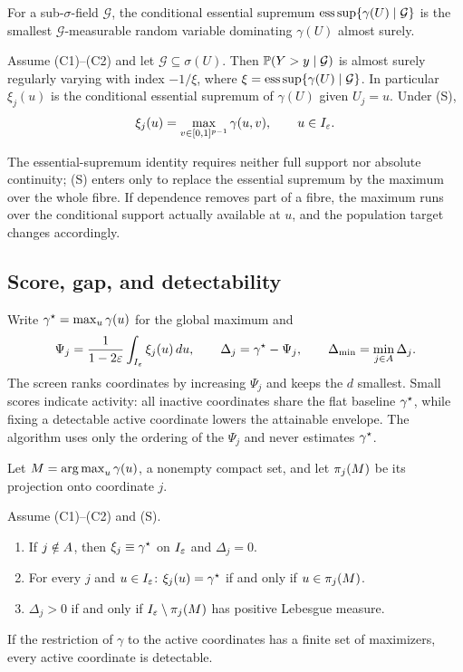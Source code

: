 For a sub-$\sigma$-field $\mathcal G$, the conditional essential
supremum $\operatorname*{ess\,sup}\{\gamma(U)\mid\mathcal G\}$ is the smallest
$\mathcal G$-measurable random variable dominating $\gamma(U)$ almost
surely.

\begin{proposition}[Projection]\label{prop:projection}
Assume (C1)--(C2) and let $\mathcal G\subseteq\sigma(U)$. Then
$\mathbb P(Y>y\mid\mathcal G)$ is almost surely regularly varying with index
$-1/\xi$, where $\xi=\operatorname*{ess\,sup}\{\gamma(U)\mid\mathcal G\}$. In particular
$\xi_j(u)$ is the conditional essential supremum of $\gamma(U)$ given
$U_j=u$. Under (S),
\begin{equation}\label{eq:fibre}
 \xi_j(u)=\max_{v\in[0,1]^{p-1}}\gamma(u,v),\qquad u\in I_\varepsilon.
\end{equation}
\end{proposition}

The essential-supremum identity requires neither full support nor absolute
continuity; (S) enters only to replace the essential supremum by the
maximum over the whole fibre. If dependence removes part of a fibre, the
maximum runs over the conditional support actually available at $u$, and
the population target changes accordingly.

\subsection{Score, gap, and detectability}

Write $\gamma^\star=\max_u\gamma(u)$ for the global maximum and
\begin{equation}\label{eq:score}
 \Psi_j=\frac{1}{1-2\varepsilon}\int_{I_\varepsilon}\xi_j(u)\,du,
 \qquad
 \Delta_j=\gamma^\star-\Psi_j,
 \qquad
 \Delta_{\min}=\min_{j\in A}\Delta_j.
\end{equation}
The screen ranks coordinates by increasing $\Psi_j$ and keeps the $d$
smallest. Small scores indicate activity: all inactive coordinates share the
flat baseline $\gamma^\star$, while fixing a detectable active coordinate lowers
the attainable envelope. The algorithm uses only the ordering of the
$\Psi_j$ and never estimates $\gamma^\star$.

Let $M=\operatorname*{arg\,max}_u\gamma(u)$, a nonempty compact set, and let $\pi_j(M)$ be
its projection onto coordinate $j$.

\begin{proposition}[Detectability]\label{prop:geometry}
Assume (C1)--(C2) and (S).
\begin{enumerate}
\item If $j\notin A$, then $\xi_j\equiv\gamma^\star$ on $I_\varepsilon$ and $\Delta_j=0$.
\item For every $j$ and $u\in I_\varepsilon$: $\xi_j(u)=\gamma^\star$ if and only if
$u\in\pi_j(M)$.
\item $\Delta_j>0$ if and only if $I_\varepsilon\setminus\pi_j(M)$ has positive
Lebesgue measure.
\end{enumerate}
If the restriction of $\gamma$ to the active coordinates has a finite set
of maximizers, every active coordinate is detectable.
\end{proposition}

